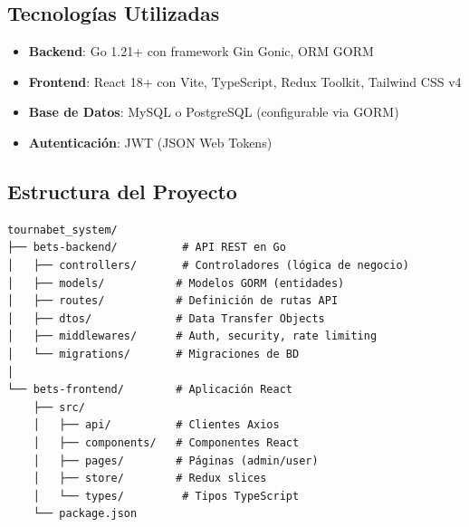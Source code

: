 \documentclass[12pt,a4paper]{article}
\begin{document}
\subsection{Tecnologías Utilizadas}
\begin{itemize}
    \item \textbf{Backend}: Go 1.21+ con framework Gin Gonic, ORM GORM
    \item \textbf{Frontend}: React 18+ con Vite, TypeScript, Redux Toolkit, Tailwind CSS v4
    \item \textbf{Base de Datos}: MySQL o PostgreSQL (configurable via GORM)
    \item \textbf{Autenticación}: JWT (JSON Web Tokens)
\end{itemize}

\subsection{Estructura del Proyecto}
\begin{verbatim}
tournabet_system/
├── bets-backend/          # API REST en Go
│   ├── controllers/       # Controladores (lógica de negocio)
│   ├── models/           # Modelos GORM (entidades)
│   ├── routes/           # Definición de rutas API
│   ├── dtos/             # Data Transfer Objects
│   ├── middlewares/      # Auth, security, rate limiting
│   └── migrations/       # Migraciones de BD
│
└── bets-frontend/        # Aplicación React
    ├── src/
    │   ├── api/          # Clientes Axios
    │   ├── components/   # Componentes React
    │   ├── pages/        # Páginas (admin/user)
    │   ├── store/        # Redux slices
    │   └── types/         # Tipos TypeScript
    └── package.json
\end{verbatim}
\end{document}
